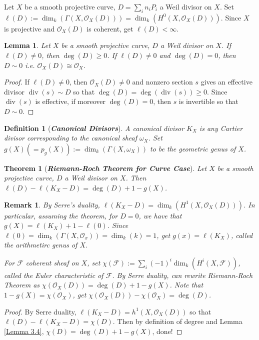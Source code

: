 \documentclass{ctexart}
\newtheorem{definition}{Definition}[section]
\newtheorem{remark}{Remark}[section]
\newtheorem{theorem}{Theorem}[section]
\newtheorem{lemma}{Lemma}[section]
\newcommand{\divisor}{\operatorname{div}}
\begin{document}
Let $X$ be a smooth projective curve, $D = \sum_{i} n_{i}P_{i}$ a Weil divisor on $X$.
Set $\ell(D) := \dim_{k}(\Gamma(X, \mathcal{O}_{X}(D))) = \dim_{k}(H^{0}(X, \mathcal{O}_{X}(D)))$.
Since $X$ is projective and $\mathcal{O}_{X}(D)$ is coherent, get $\ell(D) < \infty$.
\begin{lemma}
    Let $X$ be a smooth projective curve, $D$ a Weil divisor on $X$.
    If $\ell(D) \neq 0$, then $\deg(D) \ge 0$.
    If $\ell(D) \neq 0$ and $\deg(D) = 0$, then $D \sim 0$ i.e. $\mathcal{O}_{X}(D) \cong \mathcal{O}_{X}$.
    \label{Lemma 3.9}
\end{lemma}
\begin{proof}
    If $\ell(D) \neq 0$, then $\mathcal{O}_{X}(D) \neq 0$ and nonzero section $s$ gives an effective divisor $\divisor (s) \sim D$ so that $\deg(D) = \deg(\divisor (s)) \ge 0$.
    Since $\divisor (s)$ is effective, if moreover $\deg(D) = 0$, then $s$ is invertible so that $D \sim 0$.
\end{proof}
\begin{definition}[\textbf{\emph{Canonical Divisors}}]
    A canonical divisor $K_{X}$ is any Cartier divisor corresponding to the canonical sheaf $\omega_{X}$.
    Set $g(X) (= p_{g}(X)) := \dim_{k}(\Gamma(X, \omega_{X}))$ to be the geometric genus of $X$.
\end{definition}
\begin{theorem}[\textbf{\emph{Riemann-Roch Theorem for Curve Case}}]
    Let $X$ be a smooth projective curve, $D$ a Weil divisor on $X$.
    Then $\ell(D) - \ell(K_{X} - D) = \deg(D) + 1 - g(X)$.
    \label{Theorem 3.3}
\end{theorem}
\begin{remark}
    By Serre's duality, $\ell(K_{X} - D) = \dim_{k}(H^{1}(X, \mathcal{O}_{X}(D)))$.
    In particular, assuming the theorem, for $D = 0$, we have that $g(X) = \ell(K_{X}) + 1 - \ell(0)$.
    Since $\ell(0) = \dim_{k}(\Gamma(X, \mathcal{O}_{x})) = \dim_{k}(k) = 1$, get $g(x) = \ell(K_{X})$, called the arithmetirc genus of $X$.
    \par
    For $\mathcal{F}$ coherent sheaf on $X$, set $\chi(\mathcal{F}) := \sum_{i} (-1)^{i}\dim_{k}(H^{i}(X, \mathcal{F}))$, called the Euler characteristic of $\mathcal{F}$.
    By Serre duality, can rewrite Riemann-Roch Theorem as $\chi(\mathcal{O}_{X}(D)) = \deg(D) + 1 - g(X)$.
    Note that $1 - g(X) = \chi(\mathcal{O}_{X})$, get $\chi(\mathcal{O}_{X}(D)) - \chi(\mathcal{O}_{X}) = \deg(D)$.
\end{remark}
\begin{proof}
    By Serre duality, $\ell(K_{X} - D) = h^{1}(X, \mathcal{O}_{X}(D))$ so that $\ell(D) - \ell(K_{X} - D) = \chi(D)$.
    Then by definition of degree and Lemma \ref{Lemma 3.4}, $\chi(D) = \deg(D) + 1 - g(X)$, done!
\end{proof}
\end{document}
